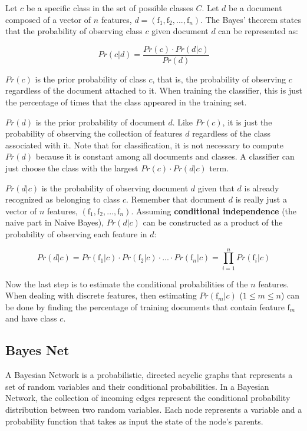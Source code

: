 \documentclass[12pt]{ucthesis}
\begin{document}
Let $c$ be a specific class in the set of possible classes $C$.
Let $d$ be a document composed of a vector of $n$ features, $d = (\textrm{f}_{1}, \textrm{f}_{2}, ..., \textrm{f}_{n})$.
The Bayes' theorem states that the probability of observing class $c$ given document $d$
can be represented as:

\begin{equation}
   Pr(c|d) = \frac{Pr(c) \cdot Pr(d|c)}{Pr(d)}
\end{equation}

$Pr(c)$ is the \textsf{prior probability} of class $c$, that is, the probability of
observing $c$ regardless of the document attached to it. When training the classifier, this
is just the percentage of times that the class appeared in the training set.

$Pr(d)$ is the \textsf{prior probability} of document $d$. Like $Pr(c)$, it is just the
probability of observing the collection of features $d$ regardless of the class associated with it.
Note that for classification, it is not necessary to compute $Pr(d)$ because it is constant among all
documents and classes. A classifier can just choose the class with the largest $Pr(c) \cdot Pr(d|c)$ term.

$Pr(d|c)$ is the probability of observing document $d$ given that $d$ is already recognized as belonging to
class $c$. Remember that document $d$ is really just a vector of $n$ features, $(\textrm{f}_{1}, \textrm{f}_{2}, ..., \textrm{f}_{n})$.
Assuming \textbf{conditional independence} (the \textsf{naive} part in Naive Bayes), $Pr(d|c)$ can be
constructed as a product of the probability of observing each feature in $d$:

\begin{equation}
   Pr(d|c) = Pr(\textrm{f}_{1}|c) \cdot Pr(\textrm{f}_{2}|c) \cdot ... \cdot Pr(\textrm{f}_{n}|c) = \prod_{i = 1}^{n}Pr(\textrm{f}_{i}|c)
\end{equation}

Now the last step is to estimate the conditional probabilities of the $n$ features.
When dealing with discrete features, then estimating $Pr(\textrm{f}_{m}|c)$ ($1 \leq m \leq n$) can be done by
finding the percentage of training documents that contain feature $\textrm{f}_{m}$ and have class $c$.

\subsection{Bayes Net}
\label{background-classification-classifiers-bayes-net}
A Bayesian Network is a probabilistic, directed acyclic graphs that represents a set of random variables and their conditional probabilities.
In a Bayesian Network, the collection of incoming edges represent the conditional probability distribution between two random variables.
Each node represents a variable and a probability function that takes as input the state of the node's parents.\cite{Pearl}\cite{Neapolitan}
\end{document}
